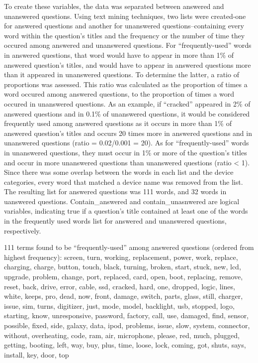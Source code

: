 \documentclass{article}
\begin{document}
  To create these variables, the data was separated between answered and unanswered questions. Using text mining techniques, two lists were created-one for answered questions and another for unanswered questions--containing every word within the question's titles and the frequency or the number of time they occured among answered and unanswered questions. For ``frequently-used'' words in answered questions, that word would have to appear in more than 1\% of answered question's titles, and would have to appear in answered questions more than it appeared in unanswered questions. To determine the latter, a ratio of proportions was assessed. This ratio was calculated as the proportion of times a word occured among answered questions, to the proportion of times a word occured in unanswered questions. As an example, if ``cracked'' appeared in 2\% of answered questions and in 0.1\% of unanswered questions, it would be considered frequently used among answered questions as it occurs in more than 1\% of answered question's titles and occurs 20 times more in answered questions and in unanswered questions (ratio = 0.02/0.001 = 20). As for ``frequently-used'' words in unanswered questions, they must occur in 1\% or more of the question's titles and occur in more unanswered questions than unanswered questions (ratio < 1). Since there was some overlap between the words in each list and the device categories, every word that matched a device name was removed from the list. The resulting list for answered questions was 111 words, and 32 words in uanswered questions. Contain_answered and contain_unasnwered are logical variables, indicating true if a question's title contained at least one of the words in the frequently used words list for answered and unanswered questions, respectively. 
  
111 terms found to be ``frequently-used'' among answered questions (ordered from highest frequency): 
screen, turn, working, replacement, power, work, replace, charging, charge, button, touch, black, turning, broken, start, stuck, new, lcd, upgrade, problem, change, port, replaced, card, open, boot, replacing, remove, reset, back, drive, error, cable, ssd, cracked, hard, one, dropped, logic, lines, white, keeps, pro, dead, now, front, damage, switch, parts, glass, still, charger, issue, sim, turns, digitizer, just, mode, model, backlight, usb, stopped, logo, starting, know, unresponsive, password, factory, call, use, damaged, find, sensor, possible, fixed, side, galaxy, data, ipod, problems, issue, slow, system, connector, without, overheating, code, ram, air, microphone, please, red, much, plugged, getting, booting, left, way, buy, plus, time, loose, lock, coming, got, shuts, says, install, key, door, top
\end{document}
